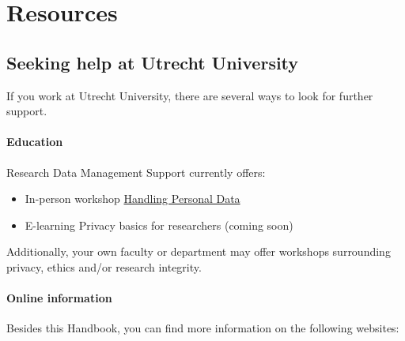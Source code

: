 \documentclass[
]{book}
\providecommand{\tightlist}{%
  \setlength{\itemsep}{0pt}\setlength{\parskip}{0pt}}
\begin{document}
\hypertarget{part-resources}{%
\part*{Resources}\label{part-resources}}

\hypertarget{seeking-help}{%
\chapter{Seeking help at Utrecht University}\label{seeking-help}}

If you work at Utrecht University, there are several ways to look for further support.

\hypertarget{education}{%
\subsection{Education}\label{education}}

Research Data Management Support currently offers:

\begin{itemize}
\tightlist
\item
  In-person workshop \href{https://www.uu.nl/en/research/research-data-management/training-workshops/handling-personal-data-in-research}{Handling Personal Data}
\item
  E-learning Privacy basics for researchers (coming soon)
\end{itemize}

Additionally, your own faculty or department may offer workshops surrounding
privacy, ethics and/or research integrity.

\hypertarget{websites}{%
\subsection{Online information}\label{websites}}

Besides this Handbook, you can find more information on the following websites:
\end{document}
